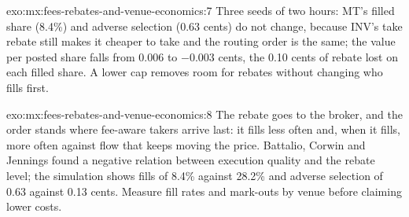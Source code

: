 \begin{solution}{exo:mx:fees-rebates-and-venue-economics:7}
Three seeds of two hours: MT's filled share (8.4\%) and adverse selection (0.63 cents) do not change, because INV's take rebate still makes it cheaper to
take and the routing order is the same; the value per posted share falls from 0.006 to $-0.003$ cents, the 0.10 cents of rebate lost on each filled share.
A lower cap removes room for rebates without changing who fills first.
\end{solution}

\begin{solution}{exo:mx:fees-rebates-and-venue-economics:8}
The rebate goes to the broker, and the order stands where fee-aware takers arrive last: it fills less often and, when it fills, more often against flow
that keeps moving the price. Battalio, Corwin and Jennings found a negative relation between  execution quality and the rebate level; the
simulation shows fills of 8.4\% against 28.2\% and adverse selection of 0.63 against 0.13 cents. Measure fill rates and mark-outs by venue before claiming
lower costs.
\end{solution}

